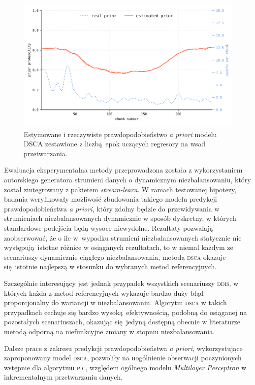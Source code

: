 \begin{figure}[!h]
	\centering
	\includegraphics[width=\textwidth, clip=true]{figures/dsca1}
	\caption{Estymowane i rzeczywiste prawdopodobieństwo \emph{a priori} modelu DSCA zestawione z liczbą epok uczących regresory na wsad przetwarzania.}\label{fig:dsca1}
\end{figure}

Ewaluacja eksperymentalna metody przeprowadzona została z wykorzystaniem autorskiego generatora strumieni danych o dynamicznym niezbalansowaniu, który został zintegrowany z pakietem \emph{stream-learn}. W ramach testowanej hipotezy, badania weryfikowały możliwość zbudowania takiego modelu predykcji prawdopodobieństwa \emph{a priori}, który zdolny będzie do przewidywania w strumieniach niezbalansowanych dynamicznie w sposób dyskretny, w których standardowe podejścia będą wysoce niewydolne. Rezultaty pozwalają zaobserwować, że o ile w~wypadku strumieni niezbalansowanych statycznie nie występują istotne różnice w osiąganych rezultatach, to w niemal każdym ze scenariuszy dynamicznie-ciągłego niezbalansowania, metoda \textsc{dsca} okazuje się istotnie najlepszą w stosunku do wybranych metod referencyjnych. 

Szczególnie interesujący jest jednak przypadek wszystkich scenariuszy \textsc{ddis}, w których każda z metod referencyjnych wykazuje bardzo duży błąd -- proporcjonalny do wariancji w niezbalansowaniu. Algorytm \textsc{dsca} w takich przypadkach cechuje się bardzo wysoką efektywnością, podobną do osiąganej na pozostałych scenariuszach, okazując się jedyną dostępną obecnie w literaturze metodą odporną na niefunkcyjne zmiany w stopniu niezbalansowania.

Dalsze prace z zakresu predykcji prawdopodobieństwa \emph{a priori}, wykorzystujące zaproponowany model \textsc{dsca}, pozwoliły na uogólnienie obserwacji poczynionych wstępnie dla algorytmu \textsc{pic}, względem ogólnego modelu \emph{Multilayer Perceptron} w inkrementalnym przetwarzaniu danych.\vspace{1em}
\newpage

